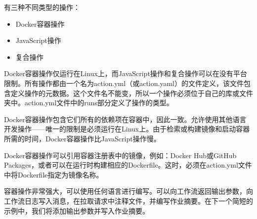 
有三种不同类型的操作：

\begin{itemize}
\item 
Docker容器操作

\item 
JavaScript操作

\item 
复合操作
\end{itemize}

Docker容器操作仅运行在Linux上，而JavaScript操作和复合操作可以在没有平台限制。所有操作都由一个名为action.yml（或action.yaml）的文件定义，该文件包含定义操作的元数据。这个文件名不能变，所以一个操作必须位于自己的库或文件夹中。action.yml文件中的runs部分定义了操作的类型。

Docker容器操作包含它们所有的依赖项在容器中，因此一致。允许使用其他语言开发操作——唯一的限制是必须运行在Linux上。由于检索或构建镜像和启动容器所需的时间，Docker容器操作比JavaScript操作慢。

Docker容器操作可以引用容器注册表中的镜像，例如：Docker Hub或GitHub Packages，或者可以在运行时构建相应的Dockerfile。这时，必须在action.yml文件中将Dockerfile指定为镜像名称。


容器操作非常强大，可以使用任何语言进行编写。可以向工作流返回输出参数，向工作流日志写入消息，在拉取请求中注释文件，并编写作业摘要。在下一个简短的示例中，我们将添加输出参数并写入作业摘要。